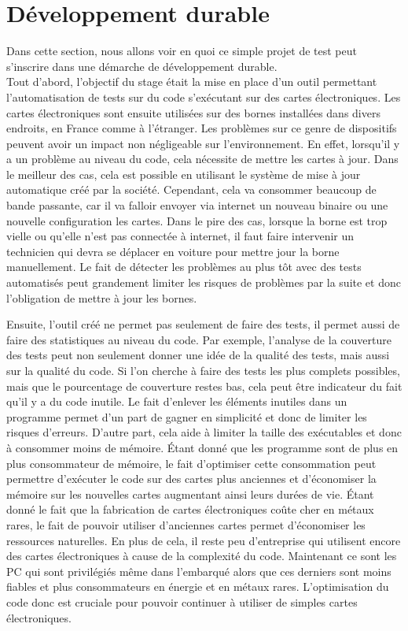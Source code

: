 \documentclass[a4paper]{article}
\begin{document}
\section{Développement durable}

Dans cette section, nous allons voir en quoi ce simple projet de test peut
s'inscrire dans une démarche de développement durable.\\

Tout d'abord, l'objectif du stage était la mise en place d'un outil permettant
l'automatisation de tests sur du code s'exécutant sur des cartes électroniques.
Les cartes électroniques sont ensuite utilisées sur des bornes installées dans
divers endroits, en France comme à l'étranger. Les problèmes sur ce genre de
dispositifs peuvent avoir un impact non négligeable sur l'environnement. En
effet, lorsqu'il y a un problème au niveau du code, cela nécessite de mettre
les cartes à jour. Dans le meilleur des cas, cela est possible en utilisant le
système de mise à jour automatique créé par la société. Cependant, cela va
consommer beaucoup de bande passante, car il va falloir envoyer via internet un
nouveau binaire ou une nouvelle configuration les cartes. Dans le pire des cas,
lorsque la borne est trop vielle ou qu'elle n'est pas connectée à internet, il
faut faire intervenir un technicien qui devra se déplacer en voiture pour mettre
jour la borne manuellement. Le fait de détecter les problèmes au plus tôt avec
des tests automatisés peut grandement limiter les risques de problèmes par la
suite et donc l'obligation de mettre à jour les bornes.

Ensuite, l'outil créé ne permet pas seulement de faire des tests, il permet
aussi de faire des statistiques au niveau du code. Par exemple, l'analyse de la
couverture des tests peut non seulement donner une idée de la qualité des tests,
mais aussi sur la qualité du code. Si l'on cherche à faire des tests les plus
complets possibles, mais que le pourcentage de couverture restes bas, cela peut
être indicateur du fait qu'il y a du code inutile. Le fait d'enlever les
éléments inutiles dans un programme permet d'un part de gagner en simplicité et
donc de limiter les risques d'erreurs. D'autre part, cela aide à limiter la
taille des exécutables et donc à consommer moins de mémoire. Étant donné que les
programme sont de plus en plus consommateur de mémoire, le fait d'optimiser
cette consommation peut permettre d'exécuter le code sur des cartes plus
anciennes et d'économiser la mémoire sur les nouvelles cartes augmentant ainsi
leurs durées de vie. Étant donné le fait que la fabrication de cartes
électroniques coûte cher en métaux rares, le fait de pouvoir utiliser
d'anciennes cartes permet d'économiser les ressources naturelles. En plus de
cela, il reste peu d'entreprise qui utilisent encore des cartes électroniques à
cause de la complexité du code. Maintenant ce sont les PC qui sont privilégiés
même dans l'embarqué alors que ces derniers sont moins fiables et plus
consommateurs en énergie et en métaux rares. L'optimisation du code donc est
cruciale pour pouvoir continuer à utiliser de simples cartes électroniques.
\end{document}
